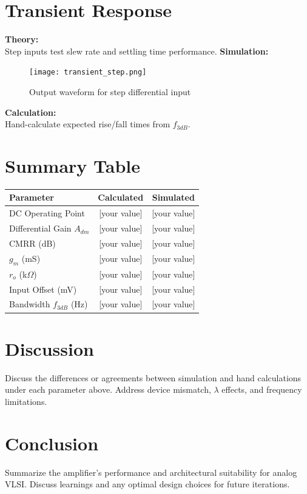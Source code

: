\documentclass[12pt,a4paper]{article}
\begin{document}
\vspace{10pt}
\section{Transient Response}
\textbf{Theory:}\\
Step inputs test slew rate and settling time performance.
\vspace{6pt}
\textbf{Simulation:}
\begin{figure}[H]
    \centering
    \texttt{[image: transient\_step.png]}
    \caption{Output waveform for step differential input}
\end{figure}
\vspace{6pt}
\textbf{Calculation:}\\
Hand-calculate expected rise/fall times from $f_{3dB}$.

\vspace{15pt}
\section{Summary Table}
\begin{center}
\begin{tabular}{@{} lcc @{}}
\toprule
\textbf{Parameter} & \textbf{Calculated} & \textbf{Simulated} \\
\midrule
DC Operating Point        & [your value] & [your value] \\
Differential Gain $A_{dm}$& [your value] & [your value] \\
CMRR (dB)                & [your value] & [your value] \\
$g_m$ (mS)               & [your value] & [your value] \\
$r_o$ (k$\Omega$)        & [your value] & [your value] \\
Input Offset (mV)        & [your value] & [your value] \\
Bandwidth $f_{3dB}$ (Hz) & [your value] & [your value] \\
\bottomrule
\end{tabular}
\end{center}

\vspace{15pt}
\section{Discussion}
Discuss the differences or agreements between simulation and hand calculations under each parameter above. Address device mismatch, $\lambda$ effects, and frequency limitations.

\vspace{15pt}
\section{Conclusion}
Summarize the amplifier's performance and architectural suitability for analog VLSI. Discuss learnings and any optimal design choices for future iterations.
\end{document}
